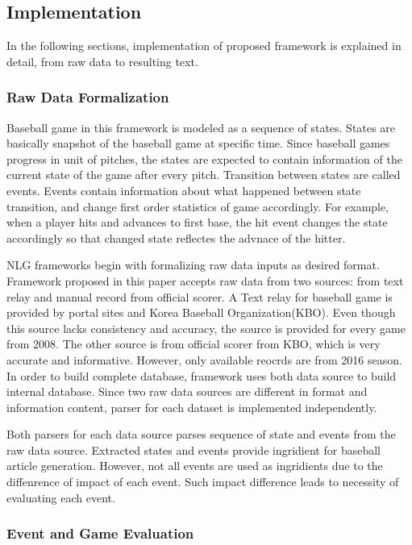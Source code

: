 \documentclass{sig-alternate}
\begin{document}
\subsection{Implementation}

In the following sections, implementation of proposed framework is explained in detail, from raw data to resulting text. 

\subsubsection{Raw Data Formalization}

Baseball game in this framework is modeled as a sequence of states. States are basically snapshot of the baseball game at specific time. Since baseball games progress in unit of pitches, the states are expected to contain information of the current state of the game after every pitch. Transition between states are called events. Events contain information about what happened between state transition, and change first order statistics of game accordingly. For example, when a player hits and advances to first base, the hit event changes the state accordingly so that changed state reflectes the advnace of the hitter. 

NLG frameworks begin with formalizing raw data inputs as desired format. Framework proposed in this paper accepts raw data from two sources: from text relay and manual record from official scorer. A Text relay for baseball game is provided by portal sites and Korea Baseball Organization(KBO). Even though this source lacks consistency and accuracy, the source is provided for every game from 2008. The other source is from official scorer from KBO, which is very accurate and informative. However, only available reocrds are from 2016 season. In order to build complete database, framework uses both data source to build internal database. Since two raw data sources are different in format and information content, parser for each dataset is implemented independently. 

Both parsers for each data source parses sequence of state and events from the raw data source. Extracted states and events provide ingridient for baseball article generation. However, not all events are used as ingridients due to the diffenrence of impact of each event. Such impact difference leads to necessity of evaluating each event. 

\subsubsection{Event and Game Evaluation} 
\end{document}
